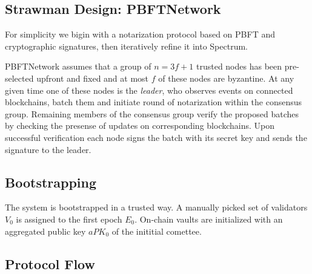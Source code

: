 \documentclass{article}
\begin{document}
    \subsection{Strawman Design: PBFTNetwork}\label{subsec:strawman-design}

    For simplicity we bigin with a notarization protocol based on PBFT and cryptographic signatures, then iteratively refine it into Spectrum.

    PBFTNetwork assumes that a group of $n = 3f + 1$ trusted nodes has been pre-selected upfront and fixed and at most $f$ of these nodes are byzantine.
    At any given time one of these nodes is the \emph{leader}, who observes events on connected blockchains,
    batch them and initiate round of notarization within the consensus group.
    Remaining members of the consensus group verify the proposed batches by checking the presense of updates on corresponding blockchains.
    Upon successful verification each node signs the batch with its secret key and sends the signature to the leader.

    \subsection{Bootstrapping}\label{subsec:bootstrapping}

    The system is bootstrapped in a trusted way.
    A manually picked set of validators $V_0$ is assigned to the first epoch $E_0$.
    On-chain vaults are initialized with an aggregated public key $aPK_0$ of the inititial comettee.

    \subsection{Protocol Flow}\label{subsec:protocol-flow}
\end{document}
